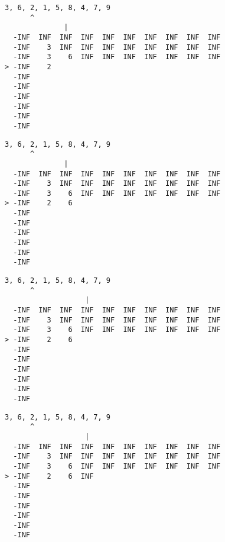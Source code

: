 { \begin{verbatim}
3, 6, 2, 1, 5, 8, 4, 7, 9
      ^
              |
  -INF  INF  INF  INF  INF  INF  INF  INF  INF  INF
  -INF    3  INF  INF  INF  INF  INF  INF  INF  INF
  -INF    3    6  INF  INF  INF  INF  INF  INF  INF
> -INF    2                                        
  -INF                                             
  -INF                                             
  -INF                                             
  -INF                                             
  -INF                                             
  -INF                                             
\end{verbatim} }

{ \begin{verbatim}
3, 6, 2, 1, 5, 8, 4, 7, 9
      ^
              |
  -INF  INF  INF  INF  INF  INF  INF  INF  INF  INF
  -INF    3  INF  INF  INF  INF  INF  INF  INF  INF
  -INF    3    6  INF  INF  INF  INF  INF  INF  INF
> -INF    2    6                                   
  -INF                                             
  -INF                                             
  -INF                                             
  -INF                                             
  -INF                                             
  -INF                                             
\end{verbatim} }

{ \begin{verbatim}
3, 6, 2, 1, 5, 8, 4, 7, 9
      ^
                   |
  -INF  INF  INF  INF  INF  INF  INF  INF  INF  INF
  -INF    3  INF  INF  INF  INF  INF  INF  INF  INF
  -INF    3    6  INF  INF  INF  INF  INF  INF  INF
> -INF    2    6                                   
  -INF                                             
  -INF                                             
  -INF                                             
  -INF                                             
  -INF                                             
  -INF                                             
\end{verbatim} }

{ \begin{verbatim}
3, 6, 2, 1, 5, 8, 4, 7, 9
      ^
                   |
  -INF  INF  INF  INF  INF  INF  INF  INF  INF  INF
  -INF    3  INF  INF  INF  INF  INF  INF  INF  INF
  -INF    3    6  INF  INF  INF  INF  INF  INF  INF
> -INF    2    6  INF                              
  -INF                                             
  -INF                                             
  -INF                                             
  -INF                                             
  -INF                                             
  -INF                                             
\end{verbatim} }

